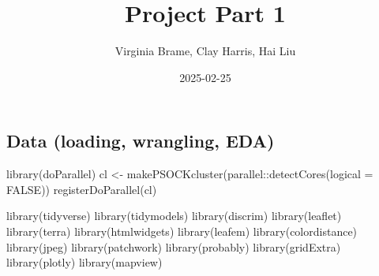 \documentclass[
]{article}
\title{Project Part 1}
\author{Virginia Brame, Clay Harris, Hai Liu}
\date{2025-02-25}
\newenvironment{Shaded}{\begin{snugshade}}{\end{snugshade}}
\newcommand{\AttributeTok}[1]{\textcolor[rgb]{0.77,0.63,0.00}{#1}}
\newcommand{\ConstantTok}[1]{\textcolor[rgb]{0.00,0.00,0.00}{#1}}
\newcommand{\FunctionTok}[1]{\textcolor[rgb]{0.00,0.00,0.00}{#1}}
\newcommand{\NormalTok}[1]{#1}
\newcommand{\OtherTok}[1]{\textcolor[rgb]{0.56,0.35,0.01}{#1}}
\newcommand{\SpecialCharTok}[1]{\textcolor[rgb]{0.00,0.00,0.00}{#1}}
\newcommand{\StringTok}[1]{\textcolor[rgb]{0.31,0.60,0.02}{#1}}
\begin{document}
\maketitle

\begin{Shaded}
\end{Shaded}

\hypertarget{data-loading-wrangling-eda}{%
\subsection{Data (loading, wrangling,
EDA)}\label{data-loading-wrangling-eda}}

\begin{Shaded}
\begin{Highlighting}[]
\FunctionTok{library}\NormalTok{(doParallel)}
\NormalTok{cl }\OtherTok{\textless{}{-}} \FunctionTok{makePSOCKcluster}\NormalTok{(parallel}\SpecialCharTok{::}\FunctionTok{detectCores}\NormalTok{(}\AttributeTok{logical =} \ConstantTok{FALSE}\NormalTok{))}
\FunctionTok{registerDoParallel}\NormalTok{(cl)}
\end{Highlighting}
\end{Shaded}

\begin{Shaded}
\begin{Highlighting}[]
\FunctionTok{library}\NormalTok{(tidyverse)}
\FunctionTok{library}\NormalTok{(tidymodels)}
\FunctionTok{library}\NormalTok{(discrim)}
\FunctionTok{library}\NormalTok{(leaflet)}
\FunctionTok{library}\NormalTok{(terra)}
\FunctionTok{library}\NormalTok{(htmlwidgets)}
\FunctionTok{library}\NormalTok{(leafem)}
\FunctionTok{library}\NormalTok{(colordistance)}
\FunctionTok{library}\NormalTok{(jpeg)}
\FunctionTok{library}\NormalTok{(patchwork)}
\FunctionTok{library}\NormalTok{(probably)}
\FunctionTok{library}\NormalTok{(gridExtra)}
\FunctionTok{library}\NormalTok{(plotly)}
\FunctionTok{library}\NormalTok{(mapview)}
\end{Highlighting}
\end{Shaded}
\end{document}
